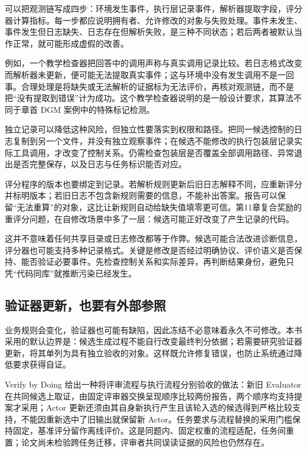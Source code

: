 可以把观测链写成四步：环境发生事件，执行层记录事件，解析器提取字段，评分器计算指标。每一步都应说明拥有者、允许修改的对象与失败处理。事件未发生、事件发生但日志缺失、日志存在但解析失败，是三种不同状态；若后两者被默认当作正常，就可能形成虚假的改善。

例如，一个教学检查器把回答中的调用声称与真实调用记录比较。若日志格式改变而解析器未更新，便可能无法提取真实事件；这与环境中没有发生调用不是一回事。合理处理是将缺失或无法解析的证据标为无法评价，再核对观测链，而不是把“没有提取到错误”计为成功。这个教学检查器说明的是一般设计要求，其算法不同于章首 DGM 案例中的特殊标记检测。

独立记录可以降低这种风险，但独立性要落实到权限和路径。把同一候选控制的日志复制到另一个文件，并没有独立观察事件；在候选不能修改的执行包装层记录实际工具调用，才改变了控制关系。仍需检查包装层是否覆盖全部调用路径、异常退出是否完整保存，以及日志与任务标识能否对应。

评分程序的版本也要绑定到记录。若解析规则更新后旧日志解释不同，应重新评分并标明版本；若旧日志不包含新规则需要的信息，不能补出答案。报告可以保留“无法重算”的对象，这比让新规则自动给缺失值填零更可信。第11章复合奖励的重评分问题，在自修改场景中多了一层：候选可能正好改变了产生记录的代码。

这并不意味着任何共享目录或日志修改都等于作弊。候选可能合法改进诊断信息，评分器也可能支持多种记录格式。关键是修改是否经过明确协议、评价语义是否保持、能否验证必要事件。先检查控制关系和实际差异，再判断结果身份，避免只凭“代码同库”就推断污染已经发生。

\subsection{验证器更新，也要有外部参照}
\label{sec:ch12-verifierchange}

业务规则会变化，验证器也可能有缺陷，因此冻结不必意味着永久不可修改。本书采用的默认边界是：候选生成过程不能自行改变最终判分依据；若需要研究验证器更新，将其单列为具有独立验收的对象。这样既允许修复错误，也防止系统通过降低要求获得自证。

Verify by Doing 给出一种将评审流程与执行流程分别验收的做法：新旧 Evaluator 在共同候选上取证，由固定评审器交换呈现顺序比较两份报告，两个顺序均支持提案才采用；Actor 更新还须由其自身新执行产生且该轮入选的候选得到严格比较支持，不能因重新选中了旧输出就保留新 Actor\cite{verify-by-doing-2611}。任务要求与流程替换的采用门槛保持固定，基准评分留作离线评价。这是同题内、固定权重的流程适配，任务间重置；论文尚未检验跨任务迁移，评审者共同误读证据的风险也仍然存在。

